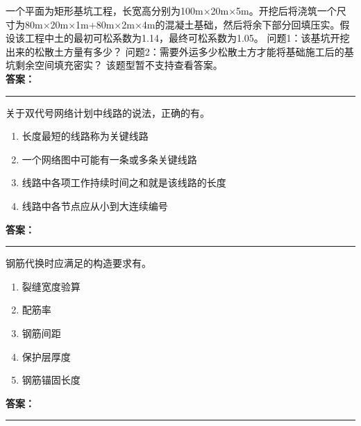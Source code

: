 \documentclass[UTF8,fontset=fandol,11pt]{ctexart}
\newcommand{\answerline}{\textcolor{answerred}{\rule{2.4cm}{0.7pt}}}
\begin{document}
\begin{quizbox}[title={乱序第 37 题｜第一章土方工程}]

一个平面为矩形基坑工程，长宽高分别为100m×20m×5m。开挖后将浇筑一个尺寸为80m×20m×1m+80m×2m×4m的混凝土基础，然后将余下部分回填压实。假设该工程中土的最初可松系数为1.14，最终可松系数为1.05。 问题1：该基坑开挖出来的松散土方量有多少？ 问题2：需要外运多少松散土方才能将基础施工后的基坑剩余空间填充密实？ 该题型暂不支持查看答案。\\

\textbf{\textcolor{answerred}{答案：}} \answerline

\end{quizbox}

\vspace{0.2em}

\begin{quizbox}[title={乱序第 38 题｜第十一章网络计划技术}]

关于双代号网络计划中线路的说法，正确的有。\\

\begin{enumerate}[label=\Alph*.]

\item 长度最短的线路称为关键线路

\item 一个网络图中可能有一条或多条关键线路

\item 线路中各项工作持续时间之和就是该线路的长度

\item 线路中各节点应从小到大连续编号

\end{enumerate}

\textbf{\textcolor{answerred}{答案：}} \answerline

\end{quizbox}

\vspace{0.2em}

\begin{quizbox}[title={乱序第 39 题｜第四章混凝土结构工程}]

钢筋代换时应满足的构造要求有。\\

\begin{enumerate}[label=\Alph*.]

\item 裂缝宽度验算

\item 配筋率

\item 钢筋间距

\item 保护层厚度

\item 钢筋锚固长度

\end{enumerate}

\textbf{\textcolor{answerred}{答案：}} \answerline

\end{quizbox}
\end{document}
